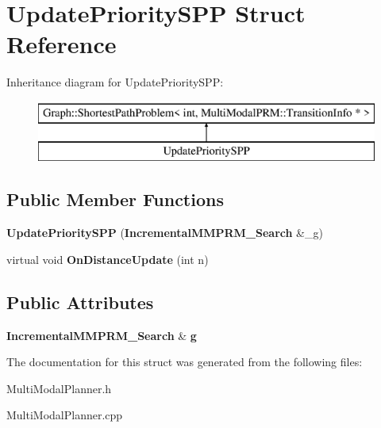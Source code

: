 \section{Update\+Priority\+S\+PP Struct Reference}
\label{structUpdatePrioritySPP}
Inheritance diagram for Update\+Priority\+S\+PP\+:\begin{figure}[H]
\begin{center}
\leavevmode
\includegraphics[height=2.000000cm]{structUpdatePrioritySPP}
\end{center}
\end{figure}
\subsection*{Public Member Functions}
\begin{DoxyCompactItemize}
\item 
{\bfseries Update\+Priority\+S\+PP} ({\bf Incremental\+M\+M\+P\+R\+M\+\_\+\+Search} \&\+\_\+g)\label{structUpdatePrioritySPP_a93902df43c81f2159b8b4077ae89efb0}

\item 
virtual void {\bfseries On\+Distance\+Update} (int n)\label{structUpdatePrioritySPP_af3a443286298411d71062659fcff3d9c}

\end{DoxyCompactItemize}
\subsection*{Public Attributes}
\begin{DoxyCompactItemize}
\item 
{\bf Incremental\+M\+M\+P\+R\+M\+\_\+\+Search} \& {\bfseries g}\label{structUpdatePrioritySPP_ac9a1c7978da69524185384168d5e2fee}

\end{DoxyCompactItemize}


The documentation for this struct was generated from the following files\+:\begin{DoxyCompactItemize}
\item 
Multi\+Modal\+Planner.\+h\item 
Multi\+Modal\+Planner.\+cpp\end{DoxyCompactItemize}
